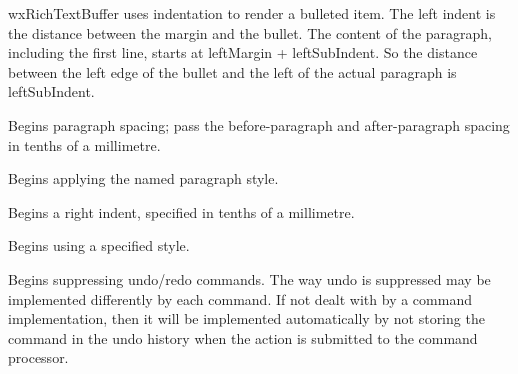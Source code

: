 wxRichTextBuffer uses indentation to render a bulleted item. The left indent is the distance between
the margin and the bullet. The content of the paragraph, including the first line, starts
at leftMargin + leftSubIndent. So the distance between the left edge of the bullet and the
left of the actual paragraph is leftSubIndent.

\label{wxrichtextbufferbeginparagraphspacing}


Begins paragraph spacing; pass the before-paragraph and after-paragraph spacing in tenths of
a millimetre.

\label{wxrichtextbufferbeginparagraphstyle}


Begins applying the named paragraph style.

\label{wxrichtextbufferbeginrightindent}


Begins a right indent, specified in tenths of a millimetre.

\label{wxrichtextbufferbeginstyle}


Begins using a specified style.

\label{wxrichtextbufferbeginsuppressundo}


Begins suppressing undo/redo commands. The way undo is suppressed may be implemented
differently by each command. If not dealt with by a command implementation, then
it will be implemented automatically by not storing the command in the undo history
when the action is submitted to the command processor.

\label{wxrichtextbufferbeginsymbolbullet}


